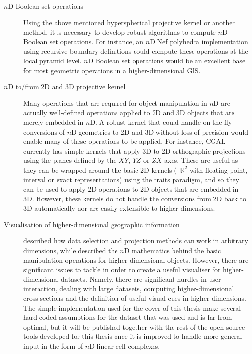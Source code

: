 \begin{description}
\item[$n$D Boolean set operations] Using the above mentioned hyperspherical projective kernel or another method, it is necessary to develop robust algorithms to compute $n$D Boolean set operations.
For instance, an $n$D Nef polyhedra implementation using recursive boundary definitions could compute these operations at the local pyramid level.
$n$D Boolean set operations would be an excellent base for most geometric operations in a higher-dimensional GIS.\@

\item[$n$D to/from 2D and 3D projective kernel] Many operations that are required for object manipulation in $n$D are actually well-defined operations applied to 2D and 3D objects that are merely embedded in $n$D.
A robust kernel that could handle on-the-fly conversions of $n$D geometries to 2D and 3D without loss of precision would enable many of these operations to be applied.
For instance, CGAL currently has simple kernels that apply 3D to 2D orthographic projections using the planes defined by the $XY$, $YZ$ or $ZX$ axes.
These are useful as they can be wrapped around the basic 2D kernels (\ie\ $\mathbb{R}^2$ with floating-point, interval or exact representations) using the traits paradigm, and so they can be used to apply 2D operations to 2D objects that are embedded in 3D.
However, these kernels do not handle the conversions from 2D back to 3D automatically nor are easily extensible to higher dimensions.

\item[Visualisation of higher-dimensional geographic information]  described how data selection and projection methods can work in arbitrary dimensions, while  described the $n$D mathematics behind the basic manipulation operations for higher-dimensional objects.
However, there are significant issues to tackle in order to create a useful visualiser for higher-dimensional datasets.
Namely, there are significant hurdles in user interaction, dealing with large datasets, computing higher-dimensional cross-sections and the definition of useful visual cues in higher dimensions.
The simple implementation used for the cover of this thesis make several hard-coded assumptions for the dataset that was used and is far from optimal, but it will be published together with the rest of the open source tools developed for this thesis once it is improved to handle more general input in the form of $n$D linear cell complexes.


\end{description}
